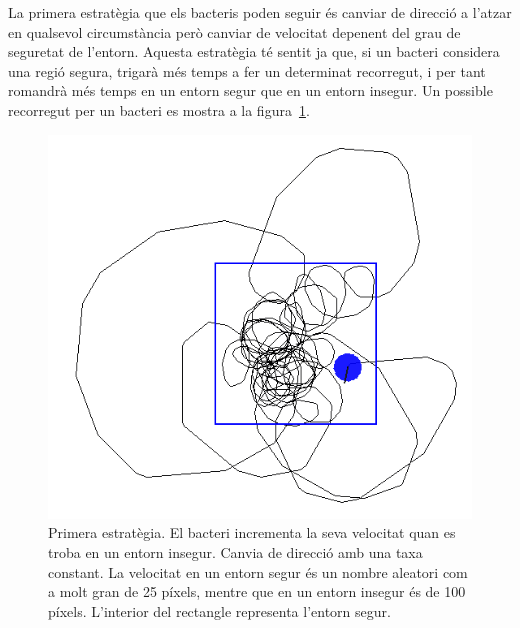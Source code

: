 La primera estratègia que els bacteris poden seguir és canviar de direcció a l'atzar en qualsevol circumstància però canviar de velocitat depenent del grau de seguretat de l'entorn. Aquesta estratègia té
sentit ja que, si un bacteri considera una regió segura, trigarà més temps a fer un determinat recorregut, i per tant romandrà més temps en un entorn segur que en un entorn insegur. Un possible recorregut per un bacteri es mostra a la figura~\ref{fig2308}.
\begin{figure}[h!]
\begin{center}
\includegraphics[scale=0.5]{Imatges/figura23-8}
\end{center}
\caption{Primera estratègia. El bacteri incrementa la seva velocitat quan es troba en un entorn insegur. Canvia de direcció amb una taxa constant. La velocitat en un entorn segur és un nombre aleatori com a molt gran de 25 píxels, mentre que en un entorn insegur és de 100 píxels. L'interior del rectangle representa l'entorn segur.}
\label{fig2308}
\end{figure}

